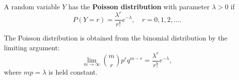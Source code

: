 A random variable $Y$ has the \textbf{Poisson distribution} with parameter $\lambda > 0$ if
$$P(Y = r) = \frac{\lambda^r}{r!} e^{-\lambda}, \quad r = 0, 1, 2, \ldots.$$

The Poisson distribution is obtained from the binomial distribution by the limiting argument:
$$\lim_{m \to \infty} \binom{m}{r} p^r q^{m-r} = \frac{\lambda^r}{r!} e^{-\lambda},$$
where $mp = \lambda$ is held constant.
